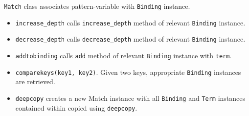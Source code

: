 \texttt{Match} class associates pattern-variable with \texttt{Binding} instance.

\begin{itemize}
\item
\texttt{increase\_depth} calls \texttt{increase\_depth} method of relevant \texttt{Binding} instance.

\item
\texttt{decrease\_depth} calls \texttt{decrease\_depth} method of relevant \texttt{Binding} instance.

\item
\texttt{addtobinding} calls \texttt{add} method of relevant \texttt{Binding} instance with \texttt{term}.

\item
\texttt{comparekeys(key1, key2)}. Given two keys, appropriate \texttt{Binding} instances are retrieved.

\item
\texttt{deepcopy} creates a new Match instance with all \texttt{Binding} and \texttt{Term} instances contained within copied using \texttt{deepcopy}.
\end{itemize}
